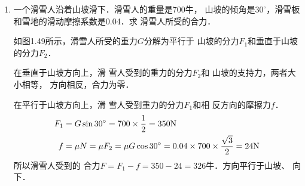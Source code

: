 \begin{enumerate}
\item 一个滑雪人沿着山坡滑下．滑雪人的重量是700牛，
山坡的倾角是$30^\circ$，滑雪板和雪地的滑动摩擦系数是0.04．求
滑雪人所受的合力．

\begin{solution}
如图1.49所示，滑雪人所受的重力$G$分解为平行于
山坡的分力$F_1$和垂直于山坡的分力$F_2$．

在垂直于山坡方向上，滑
雪人受到的重力的分力$F_2$和
山坡的支持力，两者大小相等，
方向相反，合力为零．

在平行于山坡方向上，滑
雪人受到重力的分力$F_1$和相
反方向的摩擦力$f$．
\[\begin{split}
   F_1&=G \sin 30^{\circ} =700\times\frac{1}{2}=350{\rm N}\\
   f&=\mu N=\mu F_2=\mu G\cos 30^{\circ}=0.04\times700\times\frac{\sqrt{3}}{2}=24{\rm N}
\end{split}\]
所以滑雪人受到的
合力$F=F_1-f=350-24=326$牛．方向平行于山坡、
向下．
\end{solution}
\end{enumerate}






















































































